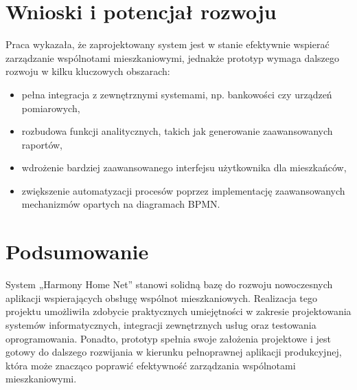 \section{Wnioski i potencjał rozwoju}
Praca wykazała, że zaprojektowany system jest w stanie efektywnie wspierać zarządzanie wspólnotami mieszkaniowymi, jednakże prototyp wymaga dalszego rozwoju w kilku kluczowych obszarach:
\begin{itemize}
    \item pełna integracja z zewnętrznymi systemami, np. bankowości czy urządzeń pomiarowych,
    \item rozbudowa funkcji analitycznych, takich jak generowanie zaawansowanych raportów,
    \item wdrożenie bardziej zaawansowanego interfejsu użytkownika dla mieszkańców,
    \item zwiększenie automatyzacji procesów poprzez implementację zaawansowanych mechanizmów opartych na diagramach BPMN.
\end{itemize}

\section{Podsumowanie}
System „Harmony Home Net” stanowi solidną bazę do rozwoju nowoczesnych aplikacji wspierających obsługę wspólnot mieszkaniowych. Realizacja tego projektu umożliwiła zdobycie praktycznych umiejętności w zakresie projektowania systemów informatycznych, integracji zewnętrznych usług oraz testowania oprogramowania. Ponadto, prototyp spełnia swoje założenia projektowe i jest gotowy do dalszego rozwijania w kierunku pełnoprawnej aplikacji produkcyjnej, która może znacząco poprawić efektywność zarządzania wspólnotami mieszkaniowymi.
